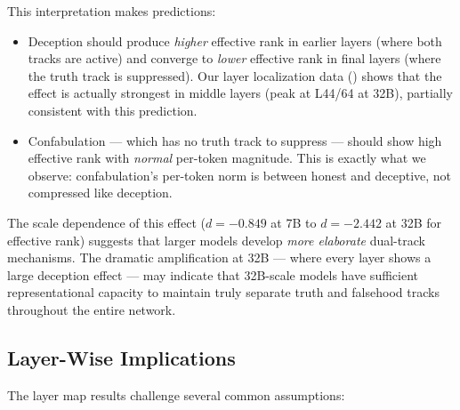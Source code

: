 \documentclass[11pt,a4paper]{article}
\begin{document}
This interpretation makes predictions:
\begin{itemize}[leftmargin=*]
    \item Deception should produce \emph{higher} effective rank in earlier layers (where both tracks are active) and converge to \emph{lower} effective rank in final layers (where the truth track is suppressed). Our layer localization data () shows that the effect is actually strongest in middle layers (peak at L44/64 at 32B), partially consistent with this prediction.

    \item Confabulation --- which has no truth track to suppress --- should show high effective rank with \emph{normal} per-token magnitude. This is exactly what we observe: confabulation's per-token norm is between honest and deceptive, not compressed like deception.
\end{itemize}

The scale dependence of this effect ($d = -0.849$ at 7B to $d = -2.442$ at 32B for effective rank) suggests that larger models develop \emph{more elaborate} dual-track mechanisms. The dramatic amplification at 32B --- where every layer shows a large deception effect --- may indicate that 32B-scale models have sufficient representational capacity to maintain truly separate truth and falsehood tracks throughout the entire network.

\subsection{Layer-Wise Implications}

The layer map results challenge several common assumptions:
\end{document}
